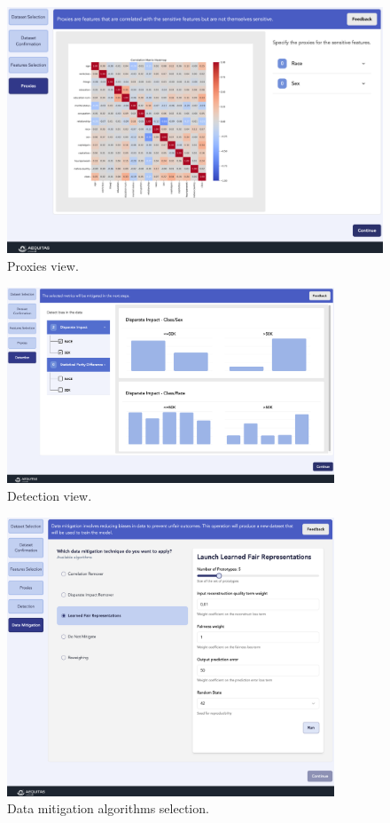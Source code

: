 \documentclass[12pt,a4paper,openright,twoside]{book}
\begin{document}
\begin{figure}
    \centering
    \includegraphics[width=\textwidth]{figures/gui/proxies.png}
    \caption{Proxies view.}
    \label{fig:proxies}
\end{figure}

\begin{figure}
    \centering
    \includegraphics[width=0.87\textwidth]{figures/gui/detection.png}
    \caption{Detection view.}
    \label{fig:detection}
\end{figure}

\begin{figure}
    \centering
    \includegraphics[width=0.87\textwidth]{figures/gui/mitigation-algorithms.png}
    \caption{Data mitigation algorithms selection.}
    \label{fig:mitigation-algorithms}
\end{figure}
\end{document}
